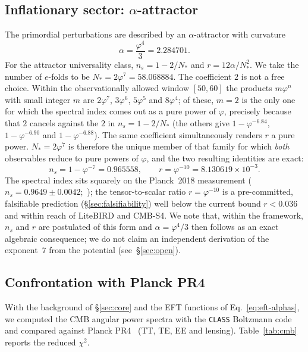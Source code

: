 \documentclass[a4paper,11pt]{article}
\begin{document}
\subsection{Inflationary sector: $\alpha$-attractor}
\label{sec:inflation}
The primordial perturbations are described by an $\alpha$-attractor
\citep{Kallosh2013} with curvature
\begin{equation}
  \label{eq:alpha-attractor}
  \alpha=\frac{\varphi^4}{3}=2.284701 .
\end{equation}
For the attractor universality class, $n_s=1-2/N_\ast$ and
$r=12\alpha/N_\ast^2$. We take the number of $e$-folds to be
$N_\ast=2\varphi^7=58.068884$. The coefficient $2$ is not a free choice. Within
the observationally allowed window $[50,60]$ the products $m\varphi^n$ with
small integer $m$ are $2\varphi^7$, $3\varphi^6$, $5\varphi^5$ and $8\varphi^4$;
of these, $m=2$ is the only one for which the spectral index comes out as a pure
power of $\varphi$, precisely because that $2$ cancels against the $2$ in
$n_s=1-2/N_\ast$ (the others give $1-\varphi^{-6.84}$, $1-\varphi^{-6.90}$ and
$1-\varphi^{-6.88}$). The same coefficient simultaneously renders $r$ a pure
power. $N_\ast=2\varphi^7$ is therefore the unique member of that family for
which \emph{both} observables reduce to pure powers of $\varphi$, and the two
resulting identities are exact:
\begin{equation}
  \label{eq:ns-r}
  n_s = 1-\varphi^{-7}=0.965558 ,
  \qquad
  r   = \varphi^{-10}=8.130619\times10^{-3} .
\end{equation}
The spectral index sits squarely on the Planck~2018 measurement
($n_s=0.9649\pm0.0042$;~\citealp{Planck2018}); the tensor-to-scalar ratio
$r=\varphi^{-10}$ is a
pre-committed, falsifiable prediction (\S\ref{sec:falsifiability}) well below
the current bound $r<0.036$ and within reach of LiteBIRD and CMB-S4. We note
that, within the framework, $n_s$ and $r$ are postulated of this form and
$\alpha=\varphi^4/3$ then follows as an exact algebraic consequence; we do not
claim an independent derivation of the exponent~$7$ from the potential
(see~\S\ref{sec:open}).

\subsection{Confrontation with Planck PR4}
\label{sec:cmb-confront}
With the background of \S\ref{sec:core} and the EFT functions of
Eq.~\eqref{eq:eft-alphas}, we computed the CMB angular power spectra with the
\texttt{CLASS} Boltzmann code~\citep{Lesgourgues2011} and compared against
Planck PR4~\citep{PlanckPR4} (TT, TE, EE and lensing).
Table~\ref{tab:cmb} reports the reduced $\chi^2$.
\end{document}
